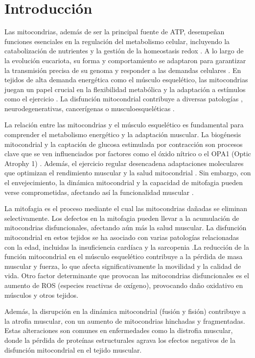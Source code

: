 
\section{Introducción}

Las mitocondrias, además de ser la principal fuente de ATP, desempeñan funciones esenciales en la regulación del metabolismo celular, incluyendo la catabolización de nutrientes y la gestión de la homeostasis redox \cite{Spinelli2018}. A lo largo de la evolución eucariota, su forma y comportamiento se adaptaron para garantizar la transmisión precisa de su genoma y responder a las demandas celulares \cite{Friedman2014}. En tejidos de alta demanda energética como el músculo esquelético, las mitocondrias juegan un papel crucial en la flexibilidad metabólica y la adaptación a estímulos como el ejercicio \cite{Memme2021, Smith2023}. La disfunción mitocondrial contribuye a diversas patologías \cite{QuintanaCabrera2023}, neurodegenerativas, cancerígenas \cite{Chan2020} o musculoesqueléticas \cite{Liu2017}.

La relación entre las mitocondrias y el músculo esquelético es fundamental para comprender el metabolismo energético y la adaptación muscular. La biogénesis mitocondrial y la captación de glucosa estimulada por contracción son procesos clave que se ven influenciados por factores como el óxido nítrico \cite{McConell2008} o el OPA1 (Optic Atrophy 1) \cite{Noone2022}. Además, el ejercicio regular desencadena adaptaciones moleculares que optimizan el rendimiento muscular y la salud mitocondrial \cite{Hargreaves2020,Egan2013}. Sin embargo, con el envejecimiento, la dinámica mitocondrial y la capacidad de mitofagia pueden verse comprometidas, afectando así la funcionalidad muscular \cite{Hood2019,Leudec}. 


La mitofagia es el proceso mediante el cual las mitocondrias dañadas se eliminan selectivamente. Los defectos en la mitofagia pueden llevar a la acumulación de mitocondrias disfuncionales, afectando aún más la salud muscular. \cite{Leudec}
La disfunción mitocondrial \cite{chen} en estos tejidos se ha asociado con varias patologías relacionadas con la edad, incluidas la insuficiencia cardíaca y la sarcopenia \cite{Boengler} .La reducción de la función mitocondrial en el músculo esquelético contribuye a la pérdida de masa muscular y fuerza, lo que afecta significativamente la movilidad y la calidad de vida.
Otro factor determinante que provocan las mitocondrias disfuncionales es el aumento de ROS (especies reactivas de oxígeno), provocando daño oxidativo en músculos y otros tejidos. \cite{java}

Además, la disrupción en la dinámica mitocondrial (fusión y fisión) contribuye a la atrofia muscular, con un aumento de mitocondrias hinchadas y fragmentadas. Estas alteraciones son comunes en enfermedades como la distrofia muscular, donde la pérdida de proteínas estructurales agrava los efectos negativos de la disfunción mitocondrial en el tejido muscular.

